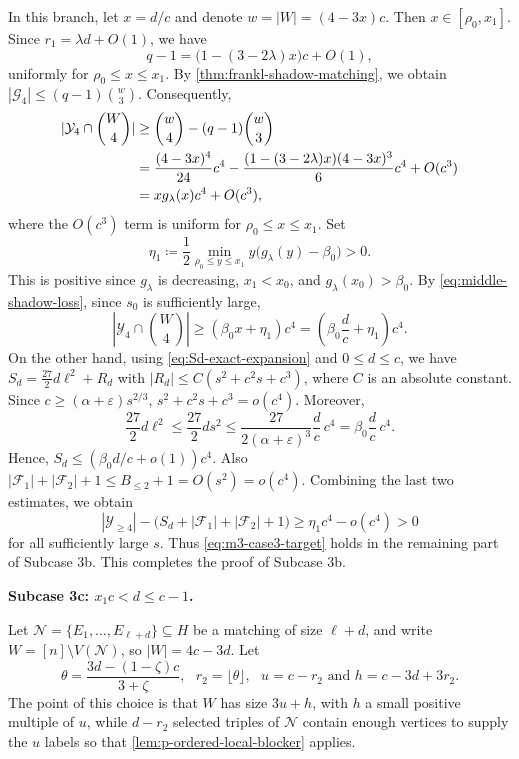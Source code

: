 \documentclass[10pt,a4paper]{article}
\numberwithin{equation}{section}
\theoremstyle{definition}
\newcommand{\F}{\mathcal F}
\newcommand{\G}{\mathcal G}
\newcommand{\Y}{\mathcal Y}
\begin{document}
In this branch, let $x=d/c$ and denote $w=|W|=(4-3x)c$.
Then $x\in[\rho_0,x_1]$.
Since $r_1=\lambda d+O(1)$, we have
\[
        q-1=\bigl(1-(3-2\lambda)x\bigr)c+O(1),
\]
uniformly for $\rho_0\le x\le x_1$.
By \cref{thm:frankl-shadow-matching}, we obtain $|\G_4|\le(q-1)\binom w3$.
Consequently,
\begin{align}
        |\Y_4\cap\binom W4|
         & \ge
        \binom w4-(q-1)\binom w3                                                     \notag   \\
         & =
        \frac{(4-3x)^4}{24}c^4
        -\frac{(1-(3-2\lambda)x)(4-3x)^3}{6}c^4
        +O(c^3)                                                                        \notag \\
         & =
        xg_\lambda(x)c^4+O(c^3),
        \label{eq:middle-shadow-loss}
\end{align}
where the $O(c^3)$ term is uniform for $\rho_0\le x\le x_1$.
Set
\[
        \eta_1\coloneqq\frac12\min_{\rho_0\le y\le x_1}
        y\bigl(g_\lambda(y)-\beta_0\bigr)>0.
\]
This is positive since $g_\lambda$ is decreasing, $x_1<x_0$, and $g_\lambda(x_0)>\beta_0$.
By \eqref{eq:middle-shadow-loss}, since $s_0$ is sufficiently large,
\[
        |\Y_4\cap\binom W4|
        \ge
        \left(\beta_0 x+\eta_1\right)c^4
        =
        \left(\beta_0\frac dc+\eta_1\right)c^4.
\]
On the other hand, using \eqref{eq:Sd-exact-expansion} and $0\le d\le c$, we have $S_d=\frac{27}{2}d\ell^2+R_d$ with $|R_d|\le C(s^2+c^2s+c^3)$, where $C$ is an absolute constant.
Since $c\ge(\alpha+\varepsilon)s^{2/3}$, $s^2+c^2s+c^3=o(c^4)$.
Moreover,
\[
        \frac{27}{2}d\ell^2
        \le
        \frac{27}{2}ds^2
        \le
        \frac{27}{2(\alpha+\varepsilon)^3}\frac dc\,c^4
        =\beta_0\frac dc\,c^4.
\]
Hence, $S_d\le(\beta_0d/c+o(1))c^4$.
Also $|\F_1|+|\F_2|+1\le B_{\le2}+1=O(s^2)=o(c^4)$.
Combining the last two estimates, we obtain
\[
        |\Y_{\ge4}|-\bigl(S_d+|\F_1|+|\F_2|+1\bigr)
        \ge
        \eta_1c^4-o(c^4)>0
\]
for all sufficiently large $s$.
Thus \eqref{eq:m3-case3-target} holds in the remaining part of Subcase 3b.
This completes the proof of Subcase 3b.

\medskip
\noindent\textbf{Subcase 3c: $x_1c< d\le c-1$.}
\medskip

Let $\mathcal N=\{E_1,\ldots,E_{\ell+d}\}\subseteq H$ be a matching of size $\ell+d$, and write $W=[n]\setminus V(\mathcal N)$, so $|W|=4c-3d$. Let
\[
        \theta=\frac{3d-(1-\zeta)c}{3+\zeta},\text{ }
        r_2=\lfloor\theta\rfloor,\text{ }
        u=c-r_2\text{ and }
        h=c-3d+3r_2 .
\]
The point of this choice is that $W$ has size $3u+h$, with $h$ a small positive multiple of $u$, while $d-r_2$ selected triples of $\mathcal N$ contain enough vertices to supply the $u$ labels so that \cref{lem:p-ordered-local-blocker} applies.
\end{document}
